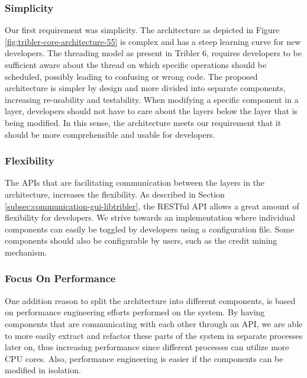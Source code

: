 \subsubsection{\textbf{Simplicity}}
Our first requirement was simplicity. The architecture as depicted in Figure \ref{fig:tribler-core-architecture-55} is complex and has a steep learning curve for new developers. The threading model as present in Tribler 6, requires developers to be sufficient aware about the thread on which specific operations should be scheduled, possibly leading to confusing or wrong code. The proposed architecture is simpler by design and more divided into separate components, increasing re-usability and testability. When modifying a specific component in a layer, developers should not have to care about the layers below the layer that is being modified. In this sense, the architecture meets our requirement that it should be more comprehensible and usable for developers.

\subsubsection{\textbf{Flexibility}}
The APIs that are facilitating communication between the layers in the architecture, increases the flexibility. As described in Section \ref{subsec:communication-gui-libtribler}, the RESTful API allows a great amount of flexibility for developers. We strive towards an implementation where individual components can easily be toggled by developers using a configuration file. Some components should also be configurable by users, such as the credit mining mechanism.

\subsubsection{\textbf{Focus On Performance}}
One addition reason to split the architecture into different components, is based on performance engineering efforts performed on the system. By having components that are communicating with each other through an API, we are able to more easily extract and refactor these parts of the system in separate processes later on, thus increasing performance since different processes can utilize more CPU cores. Also, performance engineering is easier if the components can be modified in isolation.